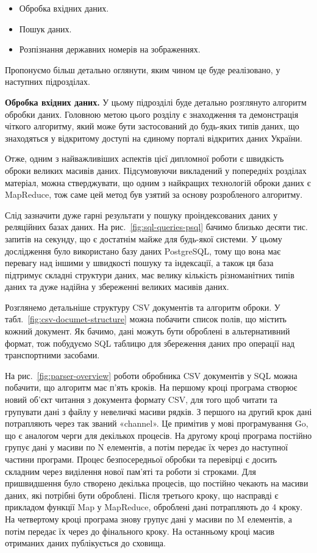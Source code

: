 \begin{itemize}
  \item Обробка вхідних даних.
  \item Пошук даних.
  \item Розпізнання державних номерів на зображеннях.
\end{itemize}

Пропонуємо більш детально оглянути, яким чином це буде реалізовано,
у наступних підрозділах.

\textbf{Обробка вхідних даних.}
У цьому підрозділі буде детально розглянуто алгоритм обробки даних.
Головною метою цього розділу є знаходження та демонстрація чіткого алгоритму,
який може бути застосований до будь-яких типів даних, що знаходяться у відкритому доступі
на єдиному порталі відкритих даних України.

Отже, одним з найважливіших аспектів цієї дипломної роботи є швидкість оброки великих масивів даних.
Підсумовуючи викладений у попередніх розділах матеріал, можна стверджувати, що одним
з найкращих технологій оброки даних є MapReduce, тож саме цей метод був узятий за основу розробленого алгоритму.

Слід зазначити дуже гарні результати у пошуку проіндексованих даних
у реляційних базах даних.
На рис.~\ref{fig:sql-queries-psql} бачимо близько десяти тис. запитів на секунду,
що є достатнім майже для будь-якої системи.
У цьому дослідження було використано базу даних PostgreSQL,
тому що вона має перевагу над іншими у швидкості пошуку та індексації,
а також ця база підтримує складні структури даних,
має велику кількість різноманітних типів даних та
дуже надійна у збереженні великих масивів даних.

Розглянемо детальніше структуру CSV документів та алгоритм оброки.
У табл.~\ref{fig:csv-documet-structure} можна побачити список полів, що містить кожний документ.
Як бачимо, дані можуть бути оброблені в альтернативний формат, тож побудуємо
SQL таблицю для збереження даних про операції над транспортними засобами.

На рис.~\ref{fig:parser-overview} роботи обробника CSV документів у SQL можна побачити, що алгоритм має п'ять кроків.
На першому кроці програма створює новий об'єкт читання з документа формату CSV, для того щоб читати та групувати дані з файлу у невеличкі масиви рядків.
З першого на другий крок дані потрапляють через так званий «channel».
Це примітив у мові програмування Go, що є аналогом черги для декількох процесів.
На другому кроці програма постійно групує дані у масиви по N елементів, а потім передає їх через до наступної частини програми.
Процес безпосередньої обробки та перевірці є досить складним через виділення нової пам'яті та роботи зі строками.
Для пришвидшення було створено декілька процесів, що постійно чекають на масиви даних, які потрібні бути оброблені.
Після третього кроку, що насправді є прикладом функції Map у MapReduce, оброблені дані потрапляють до 4 кроку.
На четвертому кроці програма знову групує дані у масиви по M елементів, а потім передає їх через до фінального кроку.
На останньому кроці масив отриманих даних публікується до сховища.

